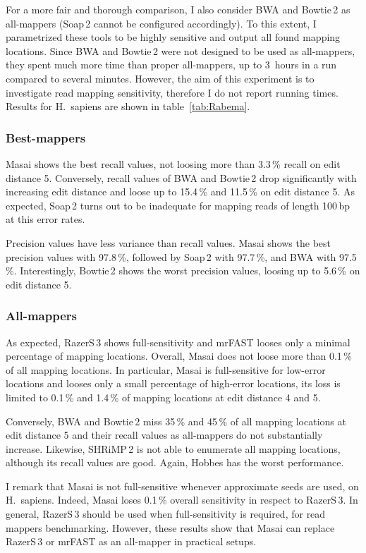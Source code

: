 For a more fair and thorough comparison, I also consider BWA and Bowtie\,2 as all-mappers (Soap\,2 cannot be configured accordingly).
To this extent, I parametrized these tools to be highly sensitive and output all found mapping locations.
Since BWA and Bowtie\,2 were not designed to be used as all-mappers, they spent much more time than proper all-mappers, \ie up to 3~hours in a run compared to several minutes.
However, the aim of this experiment is to investigate read mapping sensitivity, therefore I do not report running times.
Results for H.~sapiens are shown in table~\ref{tab:Rabema}.

\subsubsection{Best-mappers}
Masai shows the best recall values, not loosing more than 3.3\,\% recall on edit distance 5.
Conversely, recall values of BWA and Bowtie\,2 drop significantly with increasing edit distance and loose up to 15.4\,\% and 11.5\,\% on edit distance 5.
As expected, Soap\,2 turns out to be inadequate for mapping reads of length 100\,bp at this error rates.

Precision values have less variance than recall values. Masai shows the best precision values with 97.8\,\%, followed by Soap\,2 with 97.7\,\%, and BWA with 97.5\,\%. Interestingly, Bowtie\,2 shows the worst precision values, loosing up to 5.6\,\% on edit distance 5.

\subsubsection{All-mappers}
As expected, RazerS\,3 shows full-sensitivity and mrFAST looses only a minimal percentage of mapping locations.
Overall, Masai does not loose more than 0.1\,\% of all mapping locations.
In particular, Masai is full-sensitive for low-error locations and looses only a small percentage of high-error locations, \ie its loss is limited to 0.1\,\% and 1.4\,\% of mapping locations at edit distance 4 and 5.

Conversely, BWA and Bowtie\,2 miss 35\,\% and 45\,\% of all mapping locations at edit distance 5 and their recall values as all-mappers do not substantially increase.
Likewise, SHRiMP\,2 is not able to enumerate all mapping locations, although its recall values are good.
Again, Hobbes has the worst performance.

I remark that Masai is not full-sensitive whenever approximate seeds are used, \eg on H.~sapiens. Indeed, Masai loses 0.1\,\% overall sensitivity in respect to RazerS\,3.
In general, RazerS\,3 should be used when full-sensitivity is required, \ie for read mappers benchmarking. However, these results show that Masai can replace RazerS\,3 or mrFAST as an all-mapper in practical setups.

